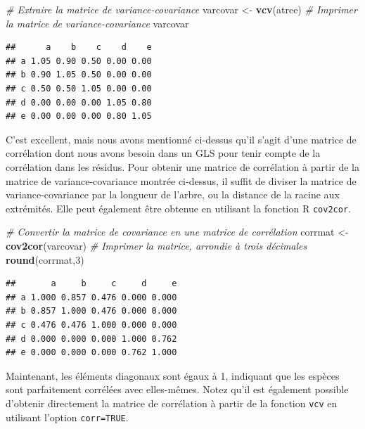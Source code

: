 \documentclass[
]{book}
\newenvironment{Shaded}{\begin{snugshade}}{\end{snugshade}}
\newcommand{\CommentTok}[1]{\textcolor[rgb]{0.56,0.35,0.01}{\textit{#1}}}
\newcommand{\DecValTok}[1]{\textcolor[rgb]{0.00,0.00,0.81}{#1}}
\newcommand{\FunctionTok}[1]{\textcolor[rgb]{0.13,0.29,0.53}{\textbf{#1}}}
\newcommand{\NormalTok}[1]{#1}
\newcommand{\OtherTok}[1]{\textcolor[rgb]{0.56,0.35,0.01}{#1}}
\begin{document}
\begin{Shaded}
\begin{Highlighting}[]
\CommentTok{\# Extraire la matrice de variance{-}covariance}
\NormalTok{varcovar }\OtherTok{\textless{}{-}} \FunctionTok{vcv}\NormalTok{(atree)}
\CommentTok{\# Imprimer la matrice de variance{-}covariance}
\NormalTok{varcovar}
\end{Highlighting}
\end{Shaded}

\begin{verbatim}
##      a    b    c    d    e
## a 1.05 0.90 0.50 0.00 0.00
## b 0.90 1.05 0.50 0.00 0.00
## c 0.50 0.50 1.05 0.00 0.00
## d 0.00 0.00 0.00 1.05 0.80
## e 0.00 0.00 0.00 0.80 1.05
\end{verbatim}

C'est excellent, mais nous avons mentionné ci-dessus qu'il s'agit d'une matrice de corrélation dont nous avons besoin dans un GLS pour tenir compte de la corrélation dans les résidus. Pour obtenir une matrice de corrélation à partir de la matrice de variance-covariance montrée ci-dessus, il suffit de diviser la matrice de variance-covariance par la longueur de l'arbre, ou la distance de la racine aux extrémités. Elle peut également être obtenue en utilisant la fonction R \texttt{cov2cor}.

\begin{Shaded}
\begin{Highlighting}[]
\CommentTok{\# Convertir la matrice de covariance en une matrice de corrélation}
\NormalTok{corrmat }\OtherTok{\textless{}{-}} \FunctionTok{cov2cor}\NormalTok{(varcovar)}
\CommentTok{\# Imprimer la matrice, arrondie à trois décimales}
\FunctionTok{round}\NormalTok{(corrmat,}\DecValTok{3}\NormalTok{)}
\end{Highlighting}
\end{Shaded}

\begin{verbatim}
##       a     b     c     d     e
## a 1.000 0.857 0.476 0.000 0.000
## b 0.857 1.000 0.476 0.000 0.000
## c 0.476 0.476 1.000 0.000 0.000
## d 0.000 0.000 0.000 1.000 0.762
## e 0.000 0.000 0.000 0.762 1.000
\end{verbatim}

Maintenant, les éléments diagonaux sont égaux à 1, indiquant que les espèces sont parfaitement corrélées avec elles-mêmes. Notez qu'il est également possible d'obtenir directement la matrice de corrélation à partir de la fonction \texttt{vcv} en utilisant l'option \texttt{corr=TRUE}.
\end{document}
